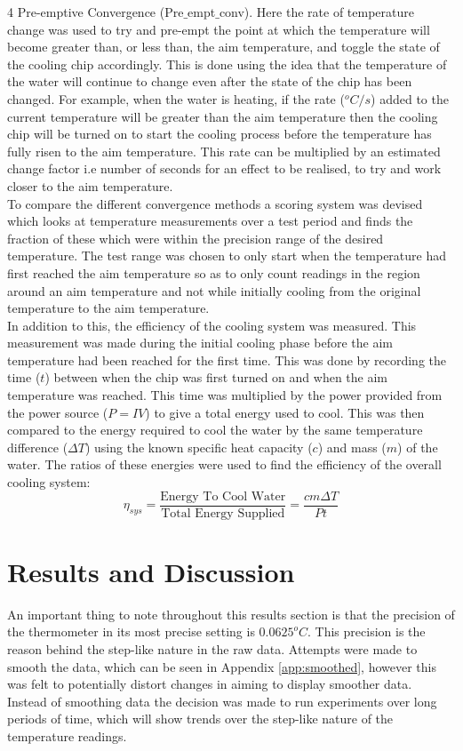 \documentclass[10pt]{article}
\begin{document}
4 Pre-emptive Convergence (Pre$\_$empt$\_$conv). Here the rate of temperature change was used to try and pre-empt the point at which the temperature will become greater than, or less than, the aim temperature, and toggle the state of the cooling chip accordingly. This is done using the idea that the temperature of the water will continue to change even after the state of the chip has been changed. For example, when the water is heating, if the rate ($^oC/s$) added to the current temperature will be greater than the aim temperature then the cooling chip will be turned on to start the cooling process before the temperature has fully risen to the aim temperature. This rate can be multiplied by an estimated change factor i.e number of seconds for an effect to be realised, to try and work closer to the aim temperature.\\

To compare the different convergence methods a scoring system was devised which looks at temperature measurements over a test period and finds the fraction of these which were within the precision range of the desired temperature. The test range was chosen to only start when the temperature had first reached the aim temperature so as to only count readings in the region around an aim temperature and not while initially cooling from the original temperature to the aim temperature.   \\

In addition to this, the efficiency of the cooling system was measured. This measurement was made during the initial cooling phase before the aim temperature had been reached for the first time. This was done by recording the time ($t$) between when the chip was first turned on and when the aim temperature was reached. This time was multiplied by the power provided from the power source ($P=IV$) to give a total energy used to cool. This was then compared to the energy required to cool the water by the same temperature difference ($\Delta T$) using the known specific heat capacity ($c$) and mass ($m$) of the water. The ratios of these energies were used to find the efficiency of the overall cooling system:
\begin{equation}
    \eta_{sys} = \frac{\text{Energy To Cool Water}}{\text{Total Energy Supplied}} = \frac{cm\Delta T}{Pt}
\end{equation}


\section*{Results and Discussion}
An important thing to note throughout this results section is that the precision of the thermometer in its most precise setting is $0.0625^oC$. This precision is the reason behind the step-like nature in the raw data. Attempts were made to smooth the data, which can be seen in Appendix \ref{app:smoothed}, however this was felt to potentially distort changes in aiming to display smoother data. Instead of smoothing data the decision was made to run experiments over long periods of time, which will show trends over the step-like nature of the temperature readings. \\
\end{document}
